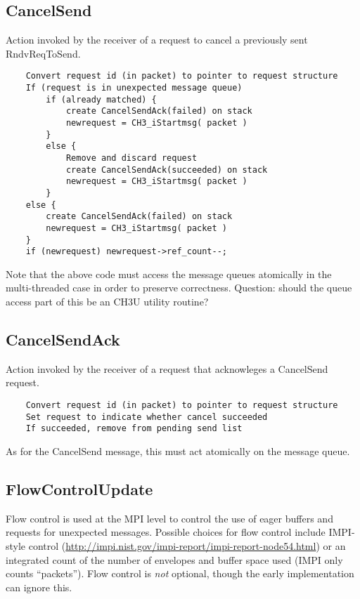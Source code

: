 \documentclass{article}
\begin{document}
\subsection{CancelSend}
Action invoked by the receiver of a request to cancel a previously sent
RndvReqToSend. 
\begin{verbatim}
    Convert request id (in packet) to pointer to request structure
    If (request is in unexpected message queue)
        if (already matched) {
            create CancelSendAck(failed) on stack
            newrequest = CH3_iStartmsg( packet )
        }
        else {
            Remove and discard request
            create CancelSendAck(succeeded) on stack
            newrequest = CH3_iStartmsg( packet )
        }
    else {
        create CancelSendAck(failed) on stack
        newrequest = CH3_iStartmsg( packet )
    }
    if (newrequest) newrequest->ref_count--;
\end{verbatim}
Note that the above code must access the message queues atomically in
the multi-threaded case in order to preserve correctness.  Question:
should the queue access part of this be an CH3U utility routine?

\subsection{CancelSendAck}
Action invoked by the receiver of a request that acknowleges a
CancelSend request.

\begin{verbatim}
    Convert request id (in packet) to pointer to request structure
    Set request to indicate whether cancel succeeded
    If succeeded, remove from pending send list
\end{verbatim}
As for the CancelSend message, this must act atomically on the message
queue.

\subsection{FlowControlUpdate}

Flow control is used at the MPI level to control the use of eager buffers and
requests for unexpected messages.  Possible choices for flow control include
IMPI-style control
(\url{http://impi.nist.gov/impi-report/impi-report-node54.html}) or an
integrated count of the number of envelopes and 
buffer space used (IMPI only counts ``packets'').  Flow control is \emph{not}
optional, though the early 
implementation can ignore this.
\end{document}
